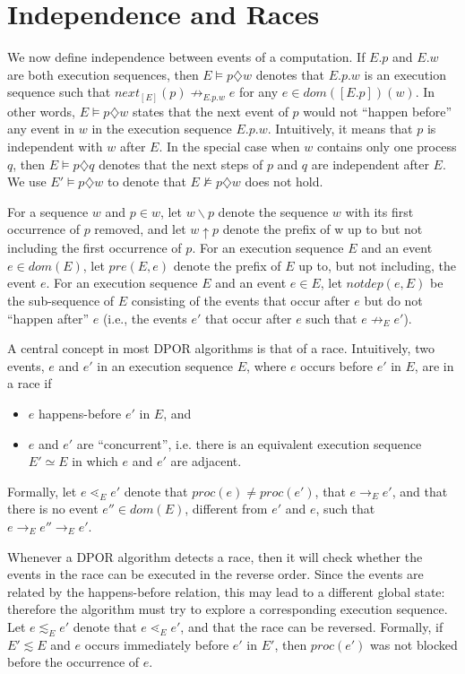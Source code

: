 \section{Independence and Races}

We now define independence between events of a computation. If
$E.p$ and $E.w$ are both execution sequences, then $E \models p\diamondsuit w$ denotes
that $E.p.w$ is an execution sequence such that $next_{[E]}(p) \not \rightarrow_{E.p.w} e$
for any $e \in dom([E.p])(w)$. In other words, $E \models p \diamondsuit w$ states that
the next event of $p$ would not “happen before” any event in $w$
in the execution sequence $E.p.w$. Intuitively, it means that $p$ is
independent with $w$ after $E$. In the special case when $w$ contains
only one process $q$, then $E \models p \diamondsuit q$ denotes that the next steps of
$p$ and $q$ are independent after $E$. We use $E'\models p \diamondsuit w$ to denote that
$E \not \models p \diamondsuit w$ does not hold.

For a sequence $w$ and $p \in w$, let $w \backslash p$ denote the sequence
$w$ with its first occurrence of $p$ removed, and let $w \uparrow p$ denote the
prefix of w up to but not including the first occurrence of $p$. For
an execution sequence $E$ and an event $e \in  dom(E)$, let $pre(E,e)$
denote the prefix of $E$ up to, but not including, the event $e$. For an
execution sequence $E$ and an event $e \in E$, let $notdep(e, E)$ be the
sub-sequence of $E$ consisting of the events that occur after $e$ but do
not “happen after” $e$ (i.e., the events $e'$ that occur after $e$ such that
$e \not \rightarrow_E e'$).


A central concept in most DPOR algorithms is that of a race.
Intuitively, two events, $e$ and $e'$ in an execution sequence $E$, where
$e$ occurs before $e'$ in $E$, are in a race if
\begin{itemize}
\item $e$ happens-before $e'$ in $E$, and
\item $e$ and $e'$ are “concurrent”, i.e. there is an equivalent execution
sequence $E' \simeq E$ in which $e$ and $e'$ are adjacent.
\end{itemize}
Formally, let $e \lessdot_E e'$ denote that $proc(e) \not = proc(e')$, that $e \rightarrow_E e'$,
and that there is no event $e'' \in dom(E)$, different from $e'$ and $e$,
such that $e \rightarrow_E e'' \rightarrow_E e'$.

Whenever a DPOR algorithm detects a race, then it will check
whether the events in the race can be executed in the reverse order.
Since the events are related by the happens-before relation, this may
lead to a different global state: therefore the algorithm must try to
explore a corresponding execution sequence. Let $e \lesssim_E e'$ denote
that $e \lessdot_E e'$, and that the race can be reversed. Formally, if $E' \lesssim E$
and $e$ occurs immediately before $e'$ in $E'$, then $proc(e')$ was not
blocked before the occurrence of $e$.


